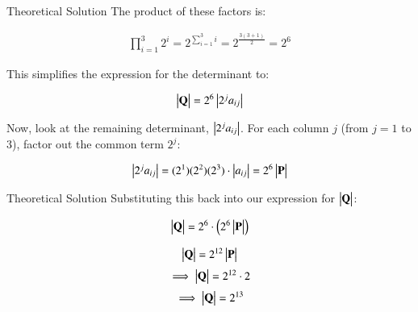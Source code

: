 \documentclass{beamer}
\begin{document}
\begin{frame}{Theoretical Solution}
The product of these factors is:

\begin{align}
\prod_{i=1}^{3} 2^i = 2^{\sum_{i=1}^{3} i} = 2^{\frac{3(3+1)}{2}} = 2^6
\end{align}

This simplifies the expression for the determinant to:

\begin{align}
\begin{vmatrix}\mathbf{Q}\end{vmatrix} = 2^{6} \begin{vmatrix}2^j a_{ij}\end{vmatrix}
\end{align}

Now, look at the remaining determinant, $\begin{vmatrix}2^j a_{ij}\end{vmatrix}$. For each column $j$ (from $j=1$ to $3$),   factor out the common term $2^j$:

\begin{align}
\begin{vmatrix}2^j a_{ij}\end{vmatrix} = (2^1)(2^2)(2^3) \cdot \begin{vmatrix}a_{ij}\end{vmatrix} = 2^{6} \begin{vmatrix}\mathbf{P}\end{vmatrix}
\end{align}
\end{frame}
\begin{frame}{Theoretical Solution}
Substituting this back into our expression for $\begin{vmatrix}\mathbf{Q}\end{vmatrix}$:

\begin{align}
\begin{vmatrix}\mathbf{Q}\end{vmatrix} = 2^{6} \cdot \left(2^{6} \begin{vmatrix}\mathbf{P}\end{vmatrix}\right)
\end{align}

\begin{align}
\begin{vmatrix}\mathbf{Q}\end{vmatrix} = 2^{12} \begin{vmatrix}\mathbf{P}\end{vmatrix}
\end{align}
\begin{align}
\implies\begin{vmatrix}\mathbf{Q}\end{vmatrix} = 2^{12}\cdot2
\end{align}
\begin{align}
\implies\begin{vmatrix}\mathbf{Q}\end{vmatrix} = 2^{13}
\end{align}
\end{frame}
\end{document}
